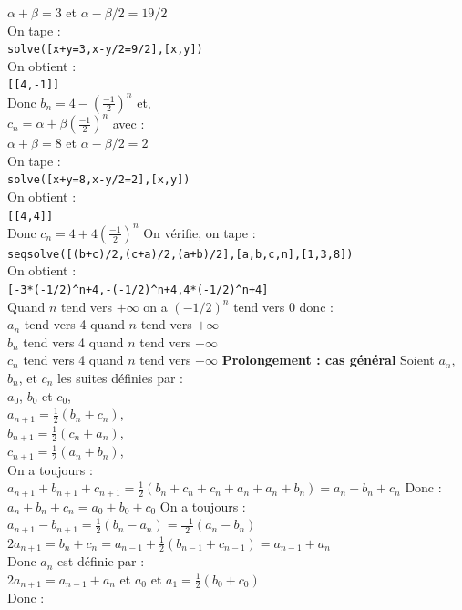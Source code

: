 \documentclass[a4paper,11pt]{book}
\begin{document}
\begin{enumerate}
$\alpha+\beta=3$ et $\alpha-\beta/2=19/2$\\
On tape :\\
{\tt solve([x+y=3,x-y/2=9/2],[x,y])}\\
On obtient :\\
{\tt [[4,-1]]}\\
Donc $b_n=4-(\frac{-1}{2})^n$
et,\\
$c_n=\alpha+\beta(\frac{-1}{2})^n$ avec :\\
$\alpha+\beta=8$ et $\alpha-\beta/2=2$\\
On tape :\\
{\tt solve([x+y=8,x-y/2=2],[x,y])}\\
On obtient :\\
{\tt [[4,4]]}\\
Donc $c_n=4+4(\frac{-1}{2})^n$
On v\'erifie, on tape :\\
{\tt seqsolve([(b+c)/2,(c+a)/2,(a+b)/2],[a,b,c,n],[1,3,8])}\\
On obtient :\\
{\tt [-3*(-1/2)\verb|^|n+4,-(-1/2)\verb|^|n+4,4*(-1/2)\verb|^|n+4]}\\
Quand $n$ tend vers $+\infty$ on a $(-1/2)^n$ tend vers 0 donc :\\
$a_n$ tend vers 4 quand $n$ tend vers $+\infty$\\
$b_n$ tend vers 4 quand $n$ tend vers $+\infty$\\
$c_n$ tend vers 4 quand $n$ tend vers $+\infty$
{\bf Prolongement : cas g\'en\'eral}
Soient $a_n$, $b_n$, et $c_n$ les suites d\'efinies par :\\
$a_0$, $b_0$ et $c_0$,\\
$a_{n+1}=\frac{1}{2}(b_n+c_n)$,\\
$b_{n+1}=\frac{1}{2}(c_n+a_n)$,\\
$c_{n+1}=\frac{1}{2}(a_n+b_n)$,\\
On a toujours :\\
$a_{n+1}+b_{n+1}+c_{n+1}=\frac{1}{2}(b_n+c_n+c_n+a_n+a_n+b_n)=a_n+b_n+c_n$
Donc :\\
$a_n+b_n+c_n=a_0+b_0+c_0$
On a toujours :\\
$a_{n+1}-b_{n+1}=\frac{1}{2}(b_n-a_n)=\frac{-1}{2}(a_n-b_n)$\\
$2a_{n+1}=b_n+c_n=a_{n-1}+\frac{1}{2}(b_{n-1}+c_{n-1})=a_{n-1}+a_n$\\
Donc $a_n$ est d\'efinie par :\\
$2a_{n+1}=a_{n-1}+a_n$ et $a_0$ et $a_1=\frac{1}{2}(b_0+c_0)$\\
Donc :\\

\end{enumerate}
\end{document}
